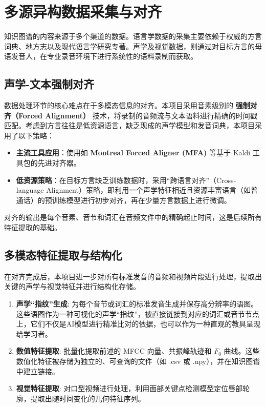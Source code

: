 \section{多源异构数据采集与对齐}
知识图谱的内容来源于多个渠道的数据。语言学数据的采集主要依赖于权威的方言词典、地方志以及现代语言学研究专著。声学及视觉数据，则通过对目标方言的母语发音人，在专业录音环境下进行系统性的语料录制而获取。

\subsection{声学-文本强制对齐}
数据处理环节的核心难点在于多模态信息的对齐。本项目采用音素级别的 \textbf{强制对齐（Forced Alignment）} 技术，将录制的音频流与文本语料进行精确的时间戳匹配。考虑到方言往往是低资源语言，缺乏现成的声学模型和发音词典，本项目采用了以下策略：
\begin{itemize}
    \item \textbf{主流工具应用}：使用如 \textbf{Montreal Forced Aligner (MFA)} 等基于 Kaldi 工具包的先进对齐器。
    \item \textbf{低资源策略}：在目标方言缺乏训练数据时，采用“跨语言对齐”（Cross-language Alignment）策略，即利用一个声学特征相近且资源丰富语言（如普通话）的预训练模型进行初步对齐，再在少量方言数据上进行微调。
\end{itemize}
对齐的输出是每个音素、音节和词汇在音频文件中的精确起止时间，这是后续所有特征提取的基础。

\subsection{多模态特征提取与结构化}
在对齐完成后，本项目进一步对所有标准发音的音频和视频片段进行处理，提取出关键的声学与视觉特征并进行结构化存储。
\begin{enumerate}
    \item \textbf{声学“指纹”生成}: 为每个音节或词汇的标准发音生成并保存高分辨率的语图。这些语图作为一种可视化的声学“指纹”，被直接链接到对应的词汇或音节节点上，它们不仅是AI模型进行精准比对的依据，也可以作为一种直观的教具呈现给学习者。
    \item \textbf{数值特征提取}: 批量化提取前述的 MFCC 向量、共振峰轨迹和 $F_0$ 曲线。这些数值化特征被存储为独立的、可查询的文件（如 .csv 或 .npy），并在知识图谱中建立链接。
    \item \textbf{视觉特征提取}: 对口型视频进行处理，利用面部关键点检测模型定位唇部轮廓，提取出随时间变化的几何特征序列。
\end{enumerate}

